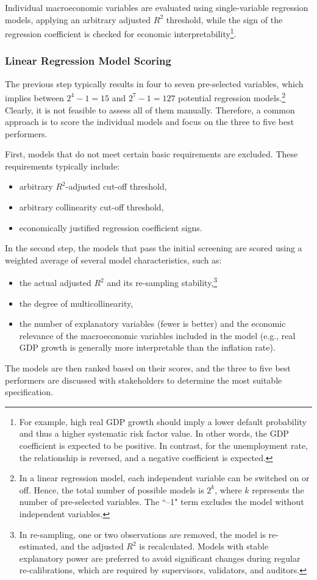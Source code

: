\documentclass[11pt,a4paper]{article}
\begin{document}
Individual macroeconomic variables are evaluated using single-variable regression models, applying an arbitrary adjusted $R^2$ threshold, while the sign of the regression coefficient is checked for economic interpretability\footnote{For example, high real GDP growth should imply a lower default probability and thus a higher systematic risk factor value. In other words, the GDP coefficient is expected to be positive. In contrast, for the unemployment rate, the relationship is reversed, and a negative coefficient is expected.}.

\subsubsection{Linear Regression Model Scoring}

The previous step typically results in four to seven pre-selected variables, which implies between $2^4 - 1 = 15$ and $2^7 - 1 = 127$ potential regression models.\footnote{In a linear regression model, each independent variable can be switched on or off. Hence, the total number of possible models is $2^k$, where $k$ represents the number of pre-selected variables. The ``–1" term excludes the model without independent variables.} Clearly, it is not feasible to assess all of them manually. Therefore, a common approach is to score the individual models and focus on the three to five best performers.

First, models that do not meet certain basic requirements are excluded. These requirements typically include:
\begin{itemize}
\item arbitrary $R^2$-adjusted cut-off threshold,
\item arbitrary collinearity cut-off threshold,
\item economically justified regression coefficient signs.
\end{itemize}

In the second step, the models that pass the initial screening are scored using a weighted average of several model characteristics, such as:
\begin{itemize}
\item the actual adjusted $R^2$ and its re-sampling stability,\footnote{In re-sampling, one or two observations are removed, the model is re-estimated, and the adjusted $R^2$ is recalculated. Models with stable explanatory power are preferred to avoid significant changes during regular re-calibrations, which are required by supervisors, validators, and auditors.}
\item the degree of multicollinearity,
\item the number of explanatory variables (fewer is better) and the economic relevance of the macroeconomic variables included in the model (e.g., real GDP growth is generally more interpretable than the inflation rate).
\end{itemize}
The models are then ranked based on their scores, and the three to five best performers are discussed with stakeholders to determine the most suitable specification.
\end{document}
